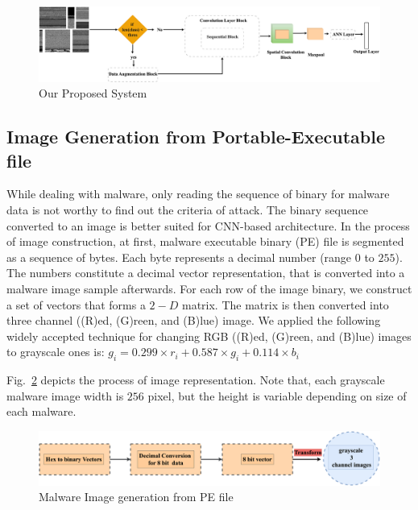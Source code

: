 \documentclass[pdflatex,sn-mathphys]{sn-jnl}%
\begin{document}
\begin{figure}[tb]
	\centering
	\includegraphics[width=1.0\textwidth]{Full-flow-2.png}
	\caption{Our Proposed System}
	\label{fig_ourProposedSystem_1}
\end{figure}

\subsection{Image Generation from Portable-Executable file}
While dealing with malware, only reading the sequence of binary for malware data is not worthy to find out the criteria of  attack. The binary sequence converted to an image is better suited for CNN-based architecture. In the process of image construction, at first, malware executable binary (PE) file is segmented as a sequence of bytes. Each byte represents a decimal number (range $0$ to $255$). The numbers constitute a decimal vector representation, that is converted into a malware image sample afterwards. For each row of the image binary, we construct a set of vectors that forms a $2-D$ matrix. The matrix is then converted into three channel ((R)ed, (G)reen, and (B)lue) image. We applied the following widely accepted technique for changing RGB ((R)ed, (G)reen, and (B)lue) images to grayscale ones is: $\displaystyle    g_i = 0.299 \times r_i + 0.587 \times g_i + 0.114 \times b_i$

Fig.~\ref{imagegeneration} depicts the process of image representation. Note that, each grayscale malware image width is $256$ pixel, but the height is variable depending on size of each malware.
\begin{figure}[tb]
	\centering
	\includegraphics[width=1.0\textwidth]{image transform.png}
	\caption{Malware Image generation from PE file}
	\label{imagegeneration}
\end{figure}
\end{document}
